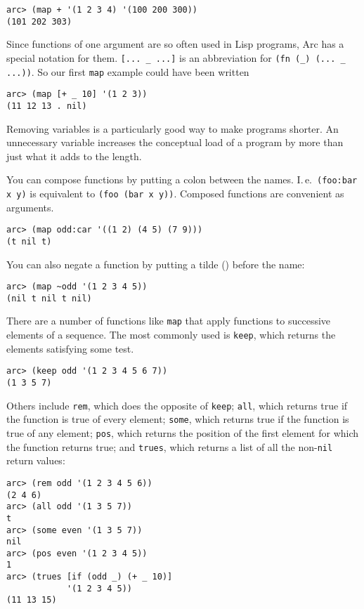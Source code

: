 \documentclass[a4paper,12pt]{book}
\begin{document}
\begin{verbatim}
arc> (map + '(1 2 3 4) '(100 200 300))
(101 202 303)
\end{verbatim}

Since functions of one argument are so often used in {\sc{}Lisp} programs,
{\sc{}Arc} has a special notation for them.  \verb|[... _ ...]|  is an abbreviation
for \verb|(fn (_) (... _ ...))|.  So our first \verb|map| example could have been
written

\begin{verbatim}
arc> (map [+ _ 10] '(1 2 3))
(11 12 13 . nil)
\end{verbatim}

Removing variables is a particularly good way to make programs
shorter.  An unnecessary variable increases the conceptual load of
a program by more than just what it adds to the length.

You can compose functions by putting a colon between the names.
I.\,e.\, \verb|(foo:bar x y)| is equivalent to \verb|(foo (bar x y))|.  Composed
functions are convenient as arguments.

\begin{verbatim}
arc> (map odd:car '((1 2) (4 5) (7 9)))
(t nil t)
\end{verbatim}

You can also negate a function by putting a tilde ({\tt{}}) before the
name:

\begin{verbatim}
arc> (map ~odd '(1 2 3 4 5)) 
(nil t nil t nil)
\end{verbatim}

There are a number of functions like \verb|map| that apply functions to
successive elements of a sequence.  The most commonly used is \verb|keep|,
which returns the elements satisfying some test.

\begin{verbatim}
arc> (keep odd '(1 2 3 4 5 6 7))
(1 3 5 7)
\end{verbatim}

Others include \verb|rem|, which does the opposite of \verb|keep|; \verb|all|, which
returns true if the function is true of every element; \verb|some|, which
returns true if the function is true of any element; \verb|pos|, which
returns the position of the first element for which the function
returns true; and \verb|trues|, which returns a list of all the non-\verb|nil| 
return values:

\begin{verbatim}
arc> (rem odd '(1 2 3 4 5 6))
(2 4 6)
arc> (all odd '(1 3 5 7))
t
arc> (some even '(1 3 5 7))
nil
arc> (pos even '(1 2 3 4 5))
1
arc> (trues [if (odd _) (+ _ 10)] 
            '(1 2 3 4 5))
(11 13 15)
\end{verbatim}
\end{document}
